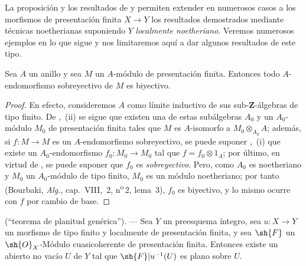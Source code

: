 \begin{env}[8.9.2]
\label{IV.8.9.2}
La proposición  y los resultados de  y  permiten extender en numerosos casos a los morfismos de presentación finita $X\to Y$ los resultados demostrados mediante técnicas noetherianas suponiendo $Y$ \emph{localmente noetheriano}.
Veremos numerosos ejemplos en lo que sigue y nos limitaremos aquí a dar algunos resultados de este tipo.
\end{env}

\begin{proposition}[8.9.3]
\label{IV.8.9.3}
Sea $A$ un anillo y sea $M$ un $A$-módulo de presentación finita.
Entonces todo $A$-endomorfismo sobreyectivo de $M$ es biyectivo.
\end{proposition}

\begin{proof}
En efecto, consideremos $A$ como límite inductivo de sus sub-$\mathbf{Z}$-álgebras de tipo finito.
De ,~(ii) se sigue que existen una de estas subálgebras $A_0$ y un $A_0$-módulo $M_0$ de presentación finita tales que $M$ es $A$-isomorfo a $M_0\otimes_{A_0}A$; además, si $f:M\to M$ es un $A$-endomorfismo sobreyectivo, se puede suponer ,~(i) que existe un $A_0$-endomorfismo $f_0:M_0\to M_0$ tal que $f=f_0\otimes 1_A$; por último, en virtud de , se puede suponer que $f_0$ es \emph{sobreyectivo}.
Pero, como $A_0$ es noetheriano y $M_0$ un $A_0$-módulo de tipo finito, $M_0$ es un módulo noetheriano; por tanto (Bourbaki, \emph{Alg.}, cap.~VIII, \textsection\,2, n\textsuperscript{o}\,2, lema~3), $f_0$ es biyectivo, y lo mismo ocurre con $f$ por cambio de base.
\end{proof}

\begin{proposition}[8.9.4]
\label{IV.8.9.4}
(``teorema de planitud genérica''). --- Sea $Y$ un preesquema íntegro, sea $u:X\to Y$ un morfismo de tipo finito y localmente de presentación finita, y sea $\sh{F}$ un $\sh{O}_X$-Módulo cuasicoherente de presentación finita.
Entonces existe un abierto no vacío $U$ de $Y$ tal que $\sh{F}|u^{-1}(U)$ es plano sobre $U$.
\end{proposition}

